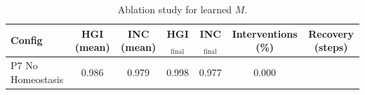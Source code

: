 \begin{table}[H]
\centering
\caption{Ablation study for learned $M$.}
\label{tab:p7_ablation}
\begin{tabular}{lcccccc}
\toprule
Config & HGI (mean) & INC (mean) & HGI$_{\text{final}}$ & INC$_{\text{final}}$ & Interventions (\%) & Recovery (steps) \\
\midrule
 P7 No Homeostasis & 0.986 & 0.979 & 0.998 & 0.977 & 0.000 &  \\
\bottomrule
\end{tabular}
\end{table}